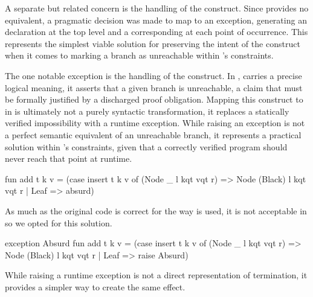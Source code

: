 A separate but related concern is the handling of the  construct. Since \cml provides no equivalent, a pragmatic decision was made to map  
to an exception, generating an  declaration at the top level and a corresponding  at each point of occurrence. This 
represents the simplest viable solution for preserving the intent of the construct when it comes to marking a branch as unreachable within \cml's constraints.

The one notable exception is the handling of the  construct. In \whyml,  carries a precise logical meaning, it asserts that a given branch 
is unreachable, a claim that must be formally justified by a discharged proof obligation. Mapping this construct to  in \cml is ultimately not a purely 
syntactic transformation, it replaces a statically verified impossibility with a runtime exception. While raising an exception is not a perfect semantic equivalent of an 
unreachable branch, it represents a practical solution within \cml's constraints, given that a correctly verified program should never reach that point at runtime.

\begin{cakeml}
    fun add t k v =
        (case insert t k v of
            (Node _ l kqt vqt r) => Node (Black) l kqt vqt r
        | Leaf => absurd)
\end{cakeml}

As much as the original code is correct for the way  is used, it is not acceptable in \cml so we opted for this solution.

\begin{cakeml}
    exception Absurd
    fun add t k v =
        (case insert t k v of
            (Node _ l kqt vqt r) => Node (Black) l kqt vqt r
        | Leaf => raise Absurd)
\end{cakeml}

While raising a runtime exception is not a direct representation of termination, it provides a simpler way to create the same effect.